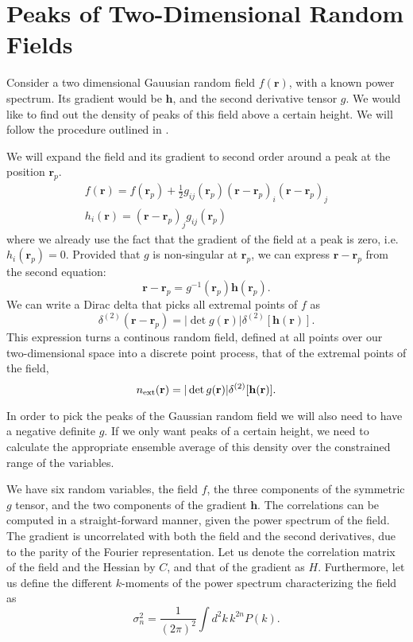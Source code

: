 \documentclass[twocolumn]{emulateapj}
\newcommand{\rr}{\mathbf{r}}
\newcommand{\hh}{\mathbf{h}}
\begin{document}
\appendix
\color{blue}

\section{Peaks of Two-Dimensional Random Fields}
\noindent
Consider a two dimensional Gauusian random field $f(\rr)$, with a known power 
spectrum. Its gradient would be $\hh$, and the second derivative tensor $g$. 
We would like to find out the density of peaks of this field above a certain 
height. We will follow the procedure outlined in \citet{bbks}.

We will expand the field and its gradient to second order around a peak at the 
position $\rr_p$.
\begin{eqnarray}
	f(\rr) = f(\rr_p)+\frac{1}{2} g_{ij}(\rr_p) (\rr-\rr_p)_i  (\rr-\rr_p)_j\\
	h_i(\rr) = (\rr-\rr_p)_j g_{ij}(\rr_p)
\end{eqnarray}
where we already use the fact that the gradient of the field at a peak is zero, 
i.e. $h_i(\rr_p)=0$. Provided that $g$ is non-singular at $\rr_p$, we can express 
$\rr-\rr_p$ from the second equation:
\begin{equation}
	\rr-\rr_p = g^{-1}(\rr_p) \hh(\rr_p).
\end{equation}
We can write a Dirac delta that picks all extremal points of $f$ as
\begin{equation}
	\delta^{(2)}(\rr-\rr_p) = |\det g(\rr)| \delta^{(2)}[\hh(\rr)].
\end{equation}
This expression turns a continous random field, defined at all points over our 
two-dimensional space into a discrete point process, that of the extremal points 
of the field,
\begin{equation}
	n_{\rm{}ext}(\rr) = |\det g(\rr)| \delta^{(2)}[\hh(\rr)].
\end{equation}

In order to pick the peaks of the Gaussian random field we will also need to have 
a negative definite $g$. If we only want peaks of a certain height, we need to 
calculate the appropriate ensemble average of this density over the constrained 
range of the variables.

We have six random variables, the field $f$, the three components of the symmetric 
$g$ tensor, and the two components of the gradient $\hh$. The correlations can be 
computed in a straight-forward manner, given the power spectrum of the field. The
gradient is uncorrelated with both the field and the second derivatives, due to the
parity of the Fourier representation. Let us denote the correlation matrix of the
field and the Hessian by $C$, and that of the gradient as $H$. Furthermore, let us 
define the different $k$-moments of the power spectrum characterizing the field as
\begin{equation}
	\sigma_n^2 = \frac{1}{(2\pi)^2} \int d^2k\, k^{2n} P(k).
\end{equation}
\end{document}
